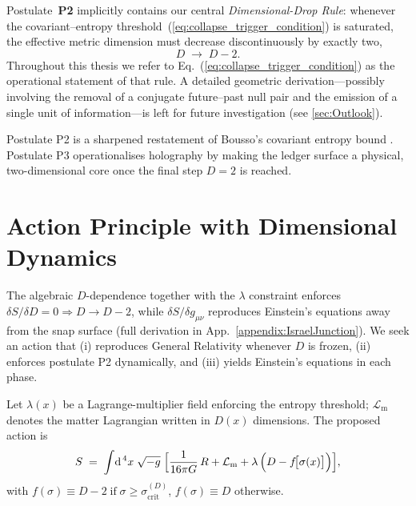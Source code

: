 \documentclass[a4paper, 12pt, oneside]{book}
\numberwithin{equation}{chapter}
\begin{document}
\begin{tcolorbox}[colback=gray!10,colframe=black,
                  title=Dimensional-Drop Rule (embedded in \textbf{P2})]
Postulate~\textbf{P2} implicitly contains our central 
\emph{Dimensional-Drop Rule}: whenever the covariant–entropy
threshold~(\ref{eq:collapse_trigger_condition}) is saturated, the
effective metric dimension must decrease discontinuously by exactly
two,
\[
D\;\longrightarrow\;D-2.
\]
Throughout this thesis we refer to
Eq.~(\ref{eq:collapse_trigger_condition}) as the operational statement
of that rule.  A detailed geometric derivation—possibly involving the
removal of a conjugate future–past null pair and the emission of a
single unit of information—is left for future investigation
(see \ref{sec:Outlook}).
\end{tcolorbox}


\noindent
Postulate P2 is a sharpened restatement of Bousso’s covariant entropy
bound \cite{Bousso1999, tHooft1993, Susskind1995}.  Postulate P3 operationalises holography by making
the ledger surface a physical, two-dimensional core once the final step
$D=2$ is reached.

\section[Action Principle]{Action Principle with Dimensional Dynamics}
\label{sec:Action}
The algebraic $D$-dependence together with the $\lambda$ constraint enforces $\delta S/\delta D=0\!\Rightarrow\!D\to D-2$, while $\delta S/\delta g_{\mu\nu}$ reproduces Einstein’s equations away
from the snap surface (full derivation in App.~\ref{appendix:IsraelJunction}).
We seek an action that (i) reproduces General Relativity whenever
$D$ is frozen, (ii) enforces postulate P2 dynamically, and
(iii) yields Einstein’s equations in each phase.

Let $\lambda(x)$ be a Lagrange-multiplier field enforcing the
entropy threshold; $\mathcal L_{\text{m}}$ denotes the matter Lagrangian
written in $D(x)$ dimensions.
The proposed action is
\begin{equation}
    S\;=\;
    \int \! \mathrm d^{\,4}x\;\sqrt{-g}\;
        \Bigl[
            \frac{1}{16\pi G}\,R
          + \mathcal L_{\text{m}}
          + \lambda\,
            \Bigl(D - f\!\bigl[\sigma(x)\bigr]\Bigr)
        \Bigr],
    \label{eq:MasterAction}
\end{equation}
with
\(f(\sigma)\equiv D - 2 \;\text{if}\; \sigma\ge\sigma_{\text{crit}}^{(D)}\),
$f(\sigma)\equiv D$ otherwise.
\end{document}
